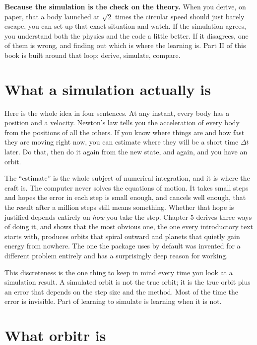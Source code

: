 \documentclass[
  10.5pt,
  letterpaper,
]{scrbook}
\theoremstyle{definition}
\theoremstyle{plain}
\theoremstyle{remark}
\begin{document}
\textbf{Because the simulation is the check on the theory.} When you
derive, on paper, that a body launched at \(\sqrt{2}\) times the
circular speed should just barely escape, you can set up that exact
situation and watch. If the simulation agrees, you understand both the
physics and the code a little better. If it disagrees, one of them is
wrong, and finding out which is where the learning is. Part II of this
book is built around that loop: derive, simulate, compare.

\section{What a simulation actually
is}\label{what-a-simulation-actually-is}

Here is the whole idea in four sentences. At any instant, every body has
a position and a velocity. Newton's law tells you the acceleration of
every body from the positions of all the others. If you know where
things are and how fast they are moving right now, you can estimate
where they will be a short time \(\Delta t\) later. Do that, then do it
again from the new state, and again, and you have an orbit.

The ``estimate'' is the whole subject of numerical integration, and it
is where the craft is. The computer never solves the equations of
motion. It takes small steps and hopes the error in each step is small
enough, and cancels well enough, that the result after a million steps
still means something. Whether that hope is justified depends entirely
on \emph{how} you take the step. Chapter 5 derives three ways of doing
it, and shows that the most obvious one, the one every introductory text
starts with, produces orbits that spiral outward and planets that
quietly gain energy from nowhere. The one the package uses by default
was invented for a different problem entirely and has a surprisingly
deep reason for working.

This discreteness is the one thing to keep in mind every time you look
at a simulation result. A simulated orbit is not the true orbit; it is
the true orbit plus an error that depends on the step size and the
method. Most of the time the error is invisible. Part of learning to
simulate is learning when it is not.

\section{What orbitr is}\label{what-orbitr-is}
\end{document}
